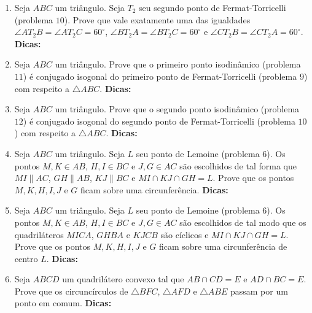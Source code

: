 \documentclass{article}
\newcommand{\dica}{\textbf{Dicas:}}
\newcommand{\iniTri}{Seja $ABC$ um triângulo}
\begin{document}
\begin{multicols}{2}
\begin{enumerate}
    \item \iniTri. Seja $T_2$ seu segundo ponto de Fermat-Torricelli (problema $10$). Prove que vale exatamente uma das igualdades $\angle AT_2B=\angle AT_2C=60^{\circ}$, $\angle BT_2A=\angle BT_2C=60^{\circ}$ e $\angle CT_2B=\angle CT_2A=60^{\circ}$. \dica %
    
    \item \iniTri. Prove que o primeiro ponto isodinâmico (problema $11$) é conjugado isogonal do primeiro ponto de Fermat-Torricelli (problema $9$) com respeito a $\triangle ABC$. \dica %
    
    \item \iniTri. Prove que o segundo ponto isodinâmico (problema $12$) é conjugado isogonal do segundo ponto de Fermat-Torricelli (problema $10$) com respeito a $\triangle ABC$. \dica %
    
    \item \iniTri. Seja $L$ seu ponto de Lemoine (problema $6$). Os pontos $M,K\in AB$, $H,I\in BC$ e $J,G\in AC$ são escolhidos de tal forma que $MI\parallel AC$, $GH\parallel AB$, $KJ\parallel BC$ e $MI\cap KJ\cap GH=L$. Prove que os pontos $M,K,H,I,J$ e $G$ ficam sobre uma circunferência. \dica %
    
    \item \iniTri. Seja $L$ seu ponto de Lemoine (problema $6$). Os pontos $M,K\in AB$, $H,I\in BC$ e $J,G\in AC$ são escolhidos de tal modo que os quadriláteros $MICA$, $GHBA$ e $KJCB$ são cíclicos e $MI\cap KJ\cap GH=L$. Prove que os pontos $M,K,H,I,J$ e $G$ ficam sobre uma circunferência de centro $L$. \dica %
    
    \item Seja $ABCD$ um quadrilátero convexo tal que $AB\cap CD=E$ e $AD\cap BC=E$. Prove que os circuncírculos de $\triangle BFC$, $\triangle AFD$ e $\triangle ABE$ passam por um ponto em comum. \dica %
    

\end{enumerate}
\end{multicols}
\end{document}
